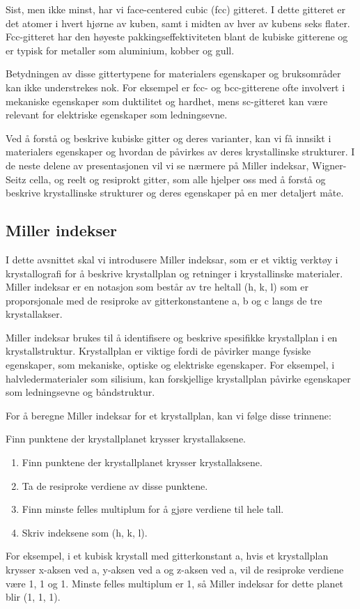Sist, men ikke minst, har vi face-centered cubic (fcc) gitteret. I dette gitteret er det atomer i hvert hjørne av kuben, samt i midten av hver av kubens seks flater. Fcc-gitteret har den høyeste pakkingseffektiviteten blant de kubiske gitterene og er typisk for metaller som aluminium, kobber og gull.

Betydningen av disse gittertypene for materialers egenskaper og bruksområder kan ikke understrekes nok. For eksempel er fcc- og bcc-gitterene ofte involvert i mekaniske egenskaper som duktilitet og hardhet, mens sc-gitteret kan være relevant for elektriske egenskaper som ledningsevne.

Ved å forstå og beskrive kubiske gitter og deres varianter, kan vi få innsikt i materialers egenskaper og hvordan de påvirkes av deres krystallinske strukturer. I de neste delene av presentasjonen vil vi se nærmere på Miller indeksar, Wigner-Seitz cella, og reelt og resiprokt gitter, som alle hjelper oss med å forstå og beskrive krystallinske strukturer og deres egenskaper på en mer detaljert måte.

\subsection*{Miller indekser}

I dette avsnittet skal vi introdusere Miller indeksar, som er et viktig verktøy i krystallografi for å beskrive krystallplan og retninger i krystallinske materialer. Miller indeksar er en notasjon som består av tre heltall (h, k, l) som er proporsjonale med de resiproke av gitterkonstantene a, b og c langs de tre krystallakser.

Miller indeksar brukes til å identifisere og beskrive spesifikke krystallplan i en krystallstruktur. Krystallplan er viktige fordi de påvirker mange fysiske egenskaper, som mekaniske, optiske og elektriske egenskaper. For eksempel, i halvledermaterialer som silisium, kan forskjellige krystallplan påvirke egenskaper som ledningsevne og båndstruktur.

For å beregne Miller indeksar for et krystallplan, kan vi følge disse trinnene:

Finn punktene der krystallplanet krysser krystallaksene.
\begin{enumerate}
    \item Finn punktene der krystallplanet krysser krystallaksene.
    \item Ta de resiproke verdiene av disse punktene.
    \item Finn minste felles multiplum for å gjøre verdiene til hele tall.
    \item Skriv indeksene som (h, k, l).

\end{enumerate}
For eksempel, i et kubisk krystall med gitterkonstant a, hvis et krystallplan krysser x-aksen ved a, y-aksen ved a og z-aksen ved a, vil de resiproke verdiene være 1, 1 og 1. Minste felles multiplum er 1, så Miller indeksar for dette planet blir (1, 1, 1).

